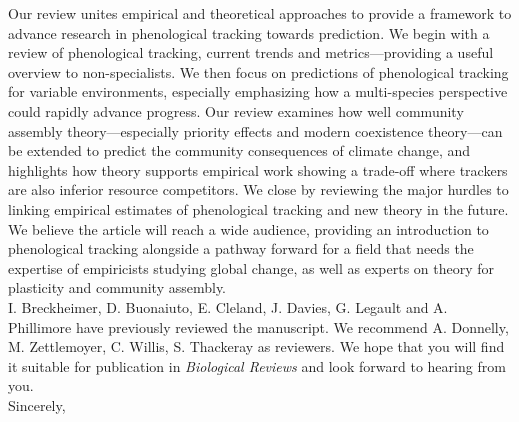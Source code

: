 \documentclass[11pt,a4paper]{article}
\begin{document}
Our review unites empirical and theoretical approaches to provide a framework to advance research in phenological tracking towards prediction. We begin with a review of phenological tracking, current trends and metrics---providing a useful overview to non-specialists. We then focus on predictions of phenological tracking for variable environments, especially emphasizing how a multi-species perspective could rapidly advance progress. Our review examines how well community assembly theory---especially priority effects and modern coexistence theory---can be extended to predict the community consequences of climate change, and highlights how theory supports empirical work showing a trade-off where trackers are also inferior resource competitors. We close by reviewing the major hurdles to linking empirical estimates of phenological tracking and new theory in the future. We believe the article will reach a wide audience, providing an introduction to phenological tracking alongside a pathway forward for a field that needs the expertise of empiricists studying global change, as well as experts on theory for plasticity and community assembly.
\vspace{1.5ex}\\
I. Breckheimer, D. Buonaiuto, E. Cleland, J. Davies, G. Legault and A. Phillimore have previously reviewed the manuscript. We recommend A. Donnelly, M. Zettlemoyer, C. Willis, S. Thackeray as reviewers.  We hope that you will find it suitable for publication in \emph{Biological Reviews} and look forward to hearing from you. %
\vspace{1.5ex}\\
Sincerely,\\
\end{document}
